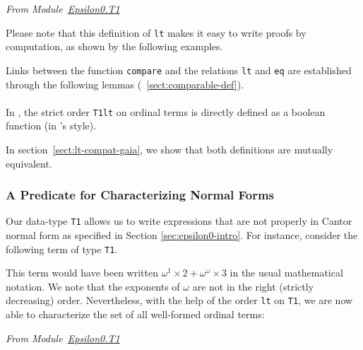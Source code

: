\vspace{4pt}
\emph{From Module~\href{../theories/html/hydras.Epsilon0.T1.html\#compare}{Epsilon0.T1}}




\label{Predicates:lt-T1}
Please note that this definition of \texttt{lt} makes it easy to write proofs by computation, as shown by the following examples.

\vspace{4pt}





Links between the function \texttt{compare} and the relations
\texttt{lt} and \texttt{eq} are established through the following lemmas (~\vref{sect:comparable-def}).
\vspace{4pt}



\paragraph*{\gaiasign}
In \gaia, the strict order \texttt{T1lt} on ordinal terms is directly defined as a boolean function (in \ssreflect's style).


In section~\vref{sect:lt-compat-gaia}, we show that both definitions are mutually equivalent.

\subsubsection{A Predicate for Characterizing Normal Forms}
\label{sect:t1-nf}

\label{sec:orgheadline74}
\label{sec:orgheadline75}
Our data-type \texttt{T1} allows us to write expressions that
are not properly in Cantor normal form as specified in Section \ref{sec:epsilon0-intro}.
For instance, consider the following term of type  \texttt{T1}. 





This term would have been written \(\omega^1\times 2 + \omega^\omega \times 3\) in the usual mathematical notation. We note that the exponents of $\omega$ are not in the right (strictly decreasing) order.
Nevertheless, with the help of the order \texttt{lt} on \texttt{T1}, we are now able to characterize
the set of all well-formed ordinal terms:


\vspace{4pt}
\noindent
\emph{From Module~\href{../theories/html/hydras.Epsilon0.T1.html\#nf_b}{Epsilon0.T1}}

